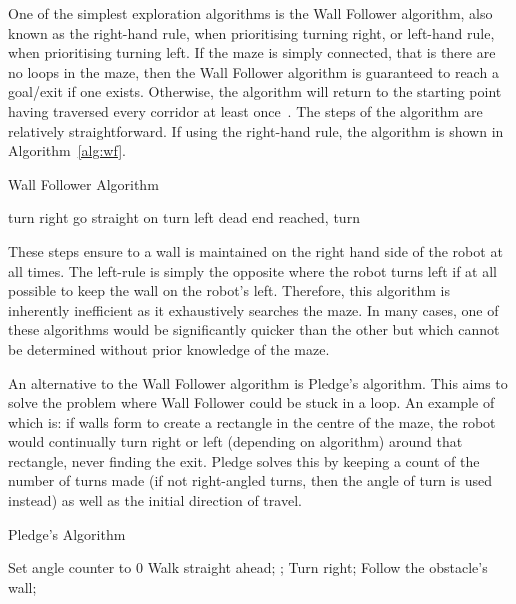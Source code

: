 One of the simplest exploration algorithms is the Wall Follower algorithm, 
also known as the right-hand rule, when prioritising turning right, or 
left-hand rule, when prioritising turning left. If the maze is simply 
connected, that is there are no loops in the maze, then the Wall Follower 
algorithm is guaranteed to reach a goal/exit if one exists. Otherwise, the 
algorithm will return to the starting point having traversed every corridor at 
least once~\cite{wallFollowerArcBotics}. The steps of the algorithm are 
relatively straightforward. If using the right-hand rule, the algorithm is shown in Algorithm~\ref{alg:wf}. 

\begin{algorithm}\label{alg:wf}
\caption{Wall Follower Algorithm}
\begin{algorithmic}
\REPEAT
{}
  \STATE turn right
  \STATE go straight on
  \STATE turn left
\ELSE
  \STATE dead end reached, turn 
\ENDIF
{}

\end{algorithmic}
\end{algorithm}

These steps ensure to a wall is maintained on the right hand side of the robot at 
all times. The left-rule is simply the opposite where the robot turns left 
if at all possible to keep the wall on the robot's left. Therefore,
this algorithm is inherently inefficient as it exhaustively searches the
maze. In many cases, one of these algorithms would be significantly quicker
than the other but which cannot be determined without prior knowledge of 
the maze.

An alternative to the Wall Follower algorithm is Pledge's algorithm. This
aims to solve the problem where Wall Follower could be stuck in a loop. An 
example of which is: if walls form to create a rectangle in the centre of 
the maze, the robot would continually turn right or left (depending on
algorithm) around that rectangle, never finding the exit. Pledge solves this
by keeping a count of the number of turns made (if not right-angled turns,
then the angle of turn is used instead) as well as the initial direction of
travel. \cite{klein2011pledge}

\begin{algorithm}
\caption{Pledge's Algorithm}
\begin{algorithmic}
\STATE Set angle counter to 0
\REPEAT
\REPEAT
\STATE Walk straight ahead;
;
\STATE Turn right;
\REPEAT
\STATE Follow the obstacle's wall;
\end{algorithmic}
\end{algorithm}


